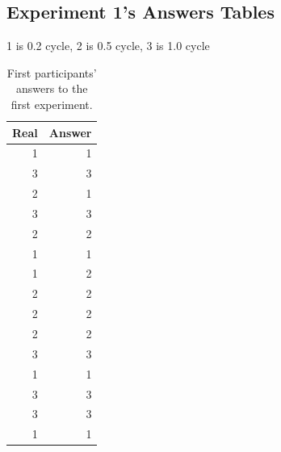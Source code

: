 \documentclass[uplatex,
12pt, %
a4paper,
english, %
oneside,
titlepage,
singlespacing, %
liststotoc, %
headsepline,
]{MastersDoctoralThesis} %
\begin{document}
%
\printbibliography[heading=bibintoc, title={References}]
%
\cleardoublepage
\appendix

\begin{appendices}
\chapter{Experiment 1's Answers Tables}
\label{appendix:a}
1 is 0.2 cycle, 2 is 0.5 cycle, 3 is 1.0 cycle
\begin{table}[H]
  \centering
  \caption{First participants' answers to the first experiment.}
    \begin{tabular}{|r|r|}
    \toprule
    \multicolumn{1}{|l|}{\textbf{Real}} & \multicolumn{1}{l|}{\textbf{Answer}} \\
    \midrule
    1     & 1 \\
    \midrule
    3     & 3 \\
    \midrule
    2     & 1 \\
    \midrule
    3     & 3 \\
    \midrule
    2     & 2 \\
    \midrule
    1     & 1 \\
    \midrule
    1     & 2 \\
    \midrule
    2     & 2 \\
    \midrule
    2     & 2 \\
    \midrule
    2     & 2 \\
    \midrule
    3     & 3 \\
    \midrule
    1     & 1 \\
    \midrule
    3     & 3 \\
    \midrule
    3     & 3 \\
    \midrule
    1     & 1 \\
    \bottomrule
    \end{tabular}%
  \label{tab:Ex1_1}%
\end{table}%


\end{appendices}
\end{document}
